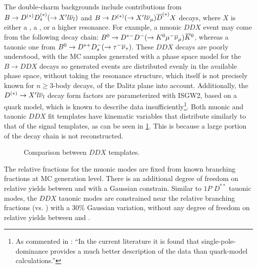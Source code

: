 The double-charm backgrounds include contributions from
$B \rightarrow D^{(*)} D_s^{(*)} (\rightarrow X' l{{\overline{\nu}}_l})$ and
$B \rightarrow D^{(*)} (\rightarrow X' l{{\overline{\nu}}_\mu}) \overline{D}^{(*)} X$
decays,
where $X$ is either a \kaon, a \Kstar, or a higher \Kstar resonance.
For example, a muonic $DDX$ event may come from the following decay chain:
${{B}^0} \rightarrow {\ensuremath{{D}^{*-}}} {\ensuremath{{D}^-}} (\rightarrow {\ensuremath{{K}^0}}{\ensuremath{\mu^-}}{\ensuremath{{\overline{\nu}}_\mu}}) {{\kern 0.18em\overline{\kern -0.18em K}}{}^0}$,
whereas a tauonic one from
${{B}^0} \rightarrow {\ensuremath{{D}^{*+}}} {\ensuremath{{D}^-_{s}}} (\rightarrow {\ensuremath{\tau^-}}{\ensuremath{{\overline{\nu}}_\tau}})$.
These $DDX$ decays are poorly understood, with the MC samples generated with
a phase space model for the $B \rightarrow DDX$ decays so generated events are
distributed evenly in the available phase space, without taking the resonance
structure,
which itself is not precisely known for $n \geq 3$-body decays,
of the Dalitz plane into account.
Additionally, the $D^{(*)} \rightarrow X' l{{\overline{\nu}}_l}$ decay form factors are
parameterized with ISGW2, based on a quark model,
which is known to describe data insufficiently\footnote{
    As commented in \cite{LHCb-ANA-2020-056}:
    ``In the current literature it is found that single-pole-dominance provides
    a much better description of the data than quark-model calculations.''
}.
Both muonic and tauonic $DDX$ fit templates have kinematic variables that
distribute similarly to that of the signal templates,
as can be seen in \cref{fig:ddx-templates}.
This is because a large portion of the decay chain is not reconstructed.

\begin{figure}[!htb]

    \caption{Comparison between $DDX$ templates.}
    \label{fig:ddx-templates}
\end{figure}

The relative fractions for the muonic modes are fixed from known branching
fractions at MC generation level.
There is an additional degree of freedom on relative yields between \Bm and \Bzb
with a Gaussian constrain.
Similar to $1P$ $D^{**}$ tauonic modes,
the $DDX$ tauonic modes are constrained near the relative branching fractions
(\tauon vs. \muon) with a 30\% Gaussian variation,
without any degree of freedom on relative yields between \Bm and \Bzb.



